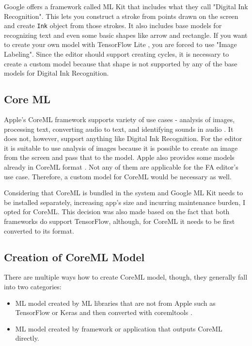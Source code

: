Google offers a framework called ML Kit that includes what they call "Digital Ink Recognition". This lets you construct a stroke from points drawn on the screen and create \lstinline{Ink} object from those strokes. It also includes base models for recognizing text and even some basic shapes like arrow and rectangle. If you want to create your own model with TensorFlow Lite \cite{tensorflow}, you are forced to use "Image Labeling". Since the editor should support creating cycles, it is necessary to create a custom model because that shape is not supported by any of the base models for Digital Ink Recognition.

\subsection{Core ML}

Apple's CoreML framework supports variety of use cases - analysis of images, processing text, converting audio to text, and identifying sounds in audio \cite{coreml}. It does not, however, support anything like Digital Ink Recognition. For the editor it is suitable to use analysis of images because it is possible to create an image from the screen and pass that to the model. Apple also provides some models already in CoreML format \cite{coreml-models}. Not any of them are applicable for the FA editor's use case. Therefore, a custom model for CoreML would be necessary as well.

Considering that CoreML is bundled in the system and Google ML Kit needs to be installed separately, increasing app's size and incurring maintenance burden, I opted for CoreML. This decision was also made based on the fact that both frameworks do support TensorFlow, although, for CoreML it needs to be first converted to its format.

\subsection{Creation of CoreML Model}

There are multiple ways how to create CoreML model, though, they generally fall into two categories:
\begin{itemize}
    \item ML model created by ML libraries that are not from Apple such as TensorFlow or Keras \cite{keras} and then converted with coremltools \cite{coremltools}.
    \item ML model created by framework or application that outputs CoreML directly.
\end{itemize}

